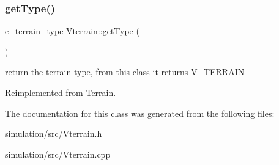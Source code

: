\mbox{\label{class_vterrain_abf5de57e84f4aac4f7cdb5c4f3e37b6a}} 
\subsubsection{\texorpdfstring{get\+Type()}{getType()}}
{\footnotesize\ttfamily \mbox{\hyperlink{_terrain_8h_a6d0b7e83bb7325270c1162bece970fd8}{e\+\_\+terrain\+\_\+type}} Vterrain\+::get\+Type (\begin{DoxyParamCaption}{ }\end{DoxyParamCaption})\hspace{0.3cm}{\ttfamily [virtual]}}

return the terrain type, from this class it returns V\+\_\+\+T\+E\+R\+R\+A\+IN 

Reimplemented from \mbox{\hyperlink{class_terrain_a6cd1220b8e64466cc7a2219efff4141b}{Terrain}}.



The documentation for this class was generated from the following files\+:\begin{DoxyCompactItemize}
\item 
simulation/src/\mbox{\hyperlink{_vterrain_8h}{Vterrain.\+h}}\item 
simulation/src/Vterrain.\+cpp\end{DoxyCompactItemize}
